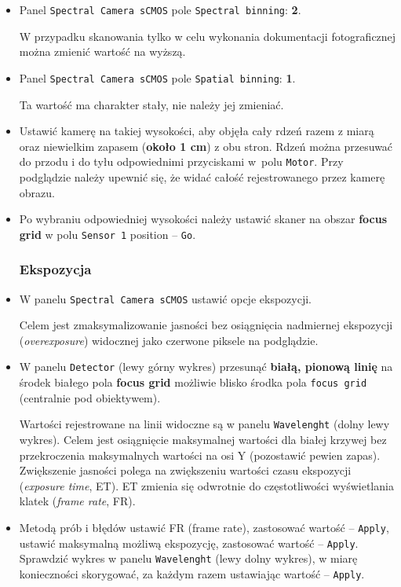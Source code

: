 \documentclass[
  letterpaper,
  DIV=11,
  numbers=noendperiod]{scrreprt}
\begin{document}
\begin{itemize}
\item
  Panel \texttt{Spectral\ Camera\ sCMOS} pole
  \texttt{Spectral\ binning}: \textbf{2}.

  W przypadku skanowania tylko w celu wykonania dokumentacji
  fotograficznej można zmienić wartość na wyższą.
\item
  Panel \texttt{Spectral\ Camera\ sCMOS} pole \texttt{Spatial\ binning}:
  \textbf{1}.

  Ta wartość ma charakter stały, nie należy jej zmieniać.
\item
  Ustawić kamerę na takiej wysokości, aby objęła cały rdzeń razem z
  miarą oraz niewielkim zapasem (\textbf{około 1 cm}) z obu stron. Rdzeń
  można przesuwać do przodu i do tyłu odpowiednimi przyciskami w~polu
  \texttt{Motor}. Przy podglądzie należy upewnić się, że widać całość
  rejestrowanego przez kamerę obrazu.
\item
  Po wybraniu odpowiedniej wysokości należy ustawić skaner na obszar
  \textbf{focus grid} w polu \texttt{Sensor\ 1} position -- \texttt{Go}.

  \hypertarget{ekspozycja}{%
  \subsubsection{Ekspozycja}\label{ekspozycja}}
\item
  W panelu \texttt{Spectral\ Camera\ sCMOS} ustawić opcje ekspozycji.

  Celem jest zmaksymalizowanie jasności bez osiągnięcia nadmiernej
  ekspozycji (\emph{overexposure}) widocznej jako czerwone piksele na
  podglądzie.
\item
  W panelu \texttt{Detector} (lewy górny wykres) przesunąć
  \textbf{białą, pionową linię} na środek białego pola \textbf{focus
  grid} możliwie blisko środka pola \texttt{focus\ grid} (centralnie pod
  obiektywem).

  Wartości rejestrowane na linii widoczne są w panelu
  \texttt{Wavelenght} (dolny lewy wykres). Celem jest osiągnięcie
  maksymalnej wartości dla białej krzywej bez przekroczenia maksymalnych
  wartości na osi Y (pozostawić pewien zapas). Zwiększenie jasności
  polega na zwiększeniu wartości czasu ekspozycji (\emph{exposure time},
  ET). ET zmienia się odwrotnie do częstotliwości wyświetlania klatek
  (\emph{frame rate}, FR).
\item
  Metodą prób i błędów ustawić FR (frame rate), zastosować wartość --
  \texttt{Apply}, ustawić maksymalną możliwą ekspozycję, zastosować
  wartość -- \texttt{Apply}. Sprawdzić wykres w panelu
  \texttt{Wavelenght} (lewy dolny wykres), w miarę konieczności
  skorygować, za każdym razem ustawiając wartość -- \texttt{Apply}.


\end{itemize}
\end{document}
